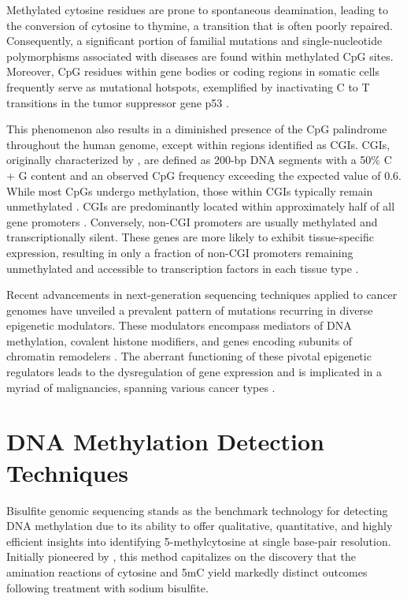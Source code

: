 Methylated cytosine residues are prone to spontaneous deamination, leading to the conversion of cytosine to thymine, a transition that is often poorly repaired. Consequently, a significant portion of familial mutations and single-nucleotide polymorphisms associated with diseases are found within methylated CpG sites. Moreover, CpG residues within gene bodies or coding regions in somatic cells frequently serve as mutational hotspots, exemplified by inactivating C to T transitions in the tumor suppressor gene p53 \citep{meth_p53}.

This phenomenon also results in a diminished presence of the CpG palindrome throughout the human genome, except within regions identified as \acp{CGI}. \acp{CGI}, originally characterized by \cite{cgi}, are defined as 200-bp DNA segments with a 50\% C + G content and an observed CpG frequency exceeding the expected value of 0.6. While most CpGs undergo methylation, those within \acp{CGI} typically remain unmethylated \citep{cgi2}. \acp{CGI} are predominantly located within approximately half of all gene promoters \citep{cgi3}. Conversely, non-\ac{CGI} promoters are usually methylated and transcriptionally silent. These genes are more likely to exhibit tissue-specific expression, resulting in only a fraction of non-CGI promoters remaining unmethylated and accessible to transcription factors in each tissue type \citep{meth_chrom}.

Recent advancements in next-generation sequencing techniques applied to cancer genomes have unveiled a prevalent pattern of mutations recurring in diverse epigenetic modulators. These modulators encompass mediators of DNA methylation, covalent histone modifiers, and genes encoding subunits of chromatin remodelers \citep{meth_cancer}. The aberrant functioning of these pivotal epigenetic regulators leads to the dysregulation of gene expression and is implicated in a myriad of malignancies, spanning various cancer types \citep{meth_cancer2}.

\section{DNA Methylation Detection Techniques}

Bisulfite genomic sequencing stands as the benchmark technology for detecting DNA methylation due to its ability to offer qualitative, quantitative, and highly efficient insights into identifying 5-methylcytosine at single base-pair resolution. Initially pioneered by \cite{bisulfite_ori}, this method capitalizes on the discovery that the amination reactions of cytosine and \ac{5mC} yield markedly distinct outcomes following treatment with sodium bisulfite.

